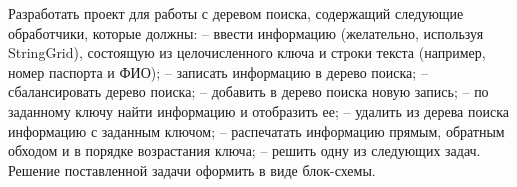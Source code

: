Разработать проект для работы с деревом поиска, содержащий
следующие обработчики, которые должны:
– ввести информацию (желательно, используя StringGrid), состоящую из
целочисленного ключа и строки текста (например, номер паспорта и ФИО);
– записать информацию в дерево поиска;
– сбалансировать дерево поиска;
– добавить в дерево поиска новую запись;
– по заданному ключу найти информацию и отобразить ее;
– удалить из дерева поиска информацию с заданным ключом;
– распечатать информацию прямым, обратным обходом и в порядке
возрастания ключа;
– решить одну из следующих задач.
Решение поставленной задачи оформить в виде блок-схемы.